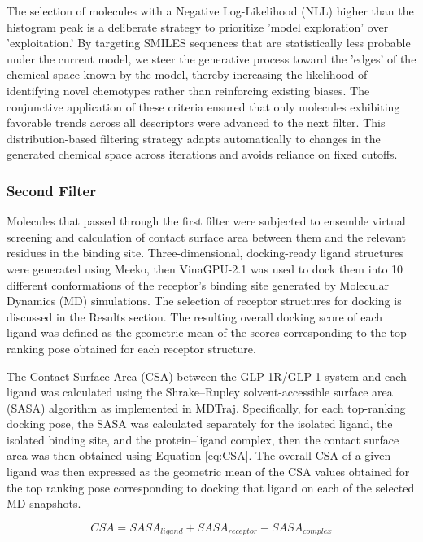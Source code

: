The selection of molecules with a Negative Log-Likelihood (NLL) higher than the histogram peak is a deliberate strategy to prioritize 'model exploration' over 'exploitation.' By targeting SMILES sequences that are statistically less probable under the current model, we steer the generative process toward the 'edges' of the chemical space known by the model, thereby increasing the likelihood of identifying novel chemotypes rather than reinforcing existing biases. The conjunctive application of these criteria ensured that only molecules exhibiting favorable trends across all descriptors were advanced to the next filter. This distribution-based filtering strategy adapts automatically to changes in the generated chemical space across iterations and avoids reliance on fixed cutoffs.

\subsubsection{Second Filter}\label{section:second_filter}
Molecules that passed through the first filter were subjected to ensemble virtual screening and calculation of contact surface area between them and the relevant residues in the binding site. 
Three-dimensional, docking-ready ligand structures were generated using Meeko\cite{Santos-Martins2025Meeko:Beyond}, then VinaGPU-2.1\cite{Ding2023Vina-GPUUnits,Tang2024Vina-GPUDerivatives} was used to dock them into 10 different conformations of the receptor's binding site generated by Molecular Dynamics (MD) simulations. The selection of receptor structures for docking is discussed in the Results section. The resulting overall docking score of each ligand was defined as the geometric mean of the scores corresponding to the top-ranking pose obtained for each receptor structure.

The Contact Surface Area (CSA) between the GLP-1R/GLP-1 system and each ligand was calculated using the Shrake–Rupley solvent-accessible surface area (SASA) algorithm as implemented in MDTraj\cite{McGibbon2015MDTraj:Trajectories}. Specifically, for each top-ranking docking pose, the SASA was calculated separately for the isolated ligand, the isolated binding site, and the protein–ligand complex, then the contact surface area was then obtained using Equation \ref{eq:CSA}. The overall CSA of a given ligand was then expressed as the geometric mean of the CSA values obtained for the top ranking pose corresponding to docking that ligand on each of the selected MD snapshots.

\begin{equation}
\label{eq:CSA}
    CSA = SASA_{ligand}+SASA_{receptor}-SASA_{complex}
\end{equation}

